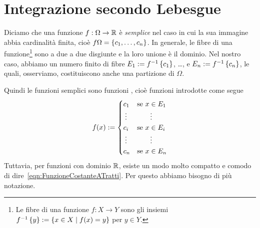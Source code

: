 
\section{Integrazione secondo Lebesgue}

Diciamo che una funzione \(f : \Omega \to \mathbb R\) è {\em semplice} nel caso in cui la sua immagine abbia cardinalità finita, cioè \(f \Omega = \left\{c_1, \dots{}, c_n\right\}\). In generale, le fibre di una funzione\footnote{Le fibre di una funzione \(f : X \to Y\) sono gli insiemi \(f^{-1}\left\{y\right\} := \left\{x \in X \mid f(x) = y\right\}\) per \(y \in Y\).} sono a due a due disgiunte e la loro unione è il dominio. Nel nostro caso, abbiamo un numero finito  di fibre \(E_1 := f^{-1}\left\{c_1\right\}\), \dots{}, e \(E_n := f^{-1}\left\{c_n\right\}\), le quali, osserviamo, costituiscono anche una partizione di \(\Omega\).

Quindi le funzioni semplici sono funzioni , cioè funzioni introdotte come segue
\begin{equation}
f(x) := \begin{cases}
c_1 & \text{se } x \in E_1 \\
\mathrel{\makebox[\widthof{\(c_i\)}]{\vdots{}}} & \mathrel{\makebox[\widthof{se \(x \in E_i\)}]{\vdots{}}} \\
c_i & \text{se } x \in E_i \\
\mathrel{\makebox[\widthof{\(c_i\)}]{\vdots{}}} & \mathrel{\makebox[\widthof{se \(x \in E_i\)}]{\vdots{}}} \\
c_n & \text{se } x \in E_n
\end{cases}\label{eqn:FunzioneCostanteATratti}
\end{equation}
Tuttavia, per funzioni con dominio \(\mathbb R\), esiste un modo molto compatto e comodo di dire~\eqref{eqn:FunzioneCostanteATratti}. Per questo abbiamo bisogno di più notazione.

